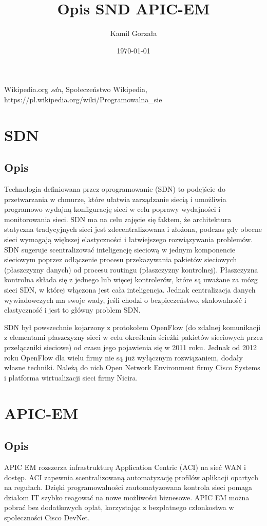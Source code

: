 \documentclass{article}
\title{Opis SND APIC-EM}
\date{\today}
\author{Kamil Gorzała}
\begin{document}
  \maketitle
  \begin{thebibliography}{9}
  Wikipedia.org
  \textit{ sdn},
  Społeczeństwo Wikipedia,
  https://pl.wikipedia.org/wiki/Programowalna_sie%
  \end{thebibliography}
  \newpage

\section{SDN}
\subsection{Opis}
	Technologia definiowana przez oprogramowanie (SDN) to podejście do przetwarzania w chmurze, które ułatwia zarządzanie siecią i umożliwia programowo wydajną konfigurację sieci w celu poprawy wydajności i monitorowania sieci.  SDN ma na celu zajęcie się faktem, że architektura statyczna tradycyjnych sieci jest zdecentralizowana i złożona, podczas gdy obecne sieci wymagają większej elastyczności i łatwiejszego rozwiązywania problemów. SDN sugeruje scentralizować inteligencję sieciową w jednym komponencie sieciowym poprzez odłączenie procesu przekazywania pakietów sieciowych (płaszczyzny danych) od procesu routingu (płaszczyzny kontrolnej). Płaszczyzna kontrolna składa się z jednego lub więcej kontrolerów, które są uważane za mózg sieci SDN, w której włączona jest cała inteligencja. Jednak centralizacja danych wywiadowczych ma swoje wady, jeśli chodzi o bezpieczeństwo,  skalowalność i elastyczność  i jest to główny problem SDN.

SDN był powszechnie kojarzony z protokołem OpenFlow (do zdalnej komunikacji z elementami płaszczyzny sieci w celu określenia ścieżki pakietów sieciowych przez przełączniki sieciowe) od czasu jego pojawienia się w 2011 roku. Jednak od 2012 roku  OpenFlow dla wielu firmy nie są już wyłącznym rozwiązaniem, dodały własne techniki. Należą do nich Open Network Environment firmy Cisco Systems i platforma wirtualizacji sieci firmy Nicira.

 \newpage
\section{APIC-EM}
\subsection{Opis}
	APIC EM rozszerza infrastrukturę Application Centric (ACI) na sieć WAN i dostęp. ACI zapewnia scentralizowaną automatyzację profilów aplikacji opartych na regułach. Dzięki programowalności zautomatyzowana kontrola sieci pomaga działom IT szybko reagować na nowe możliwości biznesowe. APIC EM można pobrać bez dodatkowych opłat, korzystając z bezpłatnego członkostwa w społeczności Cisco DevNet.
\end{document}
